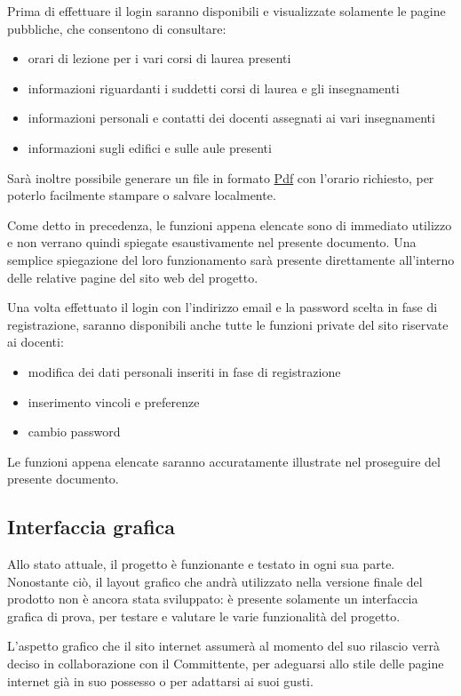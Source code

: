 \documentclass[11pt,a4paper]{article}
\begin{document}
Prima di effettuare il login saranno disponibili e visualizzate solamente le pagine pubbliche, che consentono di consultare:
\begin{itemize}
 \item orari di lezione per i vari corsi di laurea presenti
 \item informazioni riguardanti i suddetti corsi di laurea e gli insegnamenti
 \item informazioni personali e contatti dei docenti assegnati ai vari insegnamenti
 \item informazioni sugli edifici e sulle aule presenti
\end{itemize}
Sarà inoltre possibile generare un file in formato \underline{Pdf} con l'orario richiesto, per poterlo facilmente stampare o salvare localmente.

Come detto in precedenza, le funzioni appena elencate sono di immediato utilizzo e non verrano quindi spiegate esaustivamente nel presente documento.
Una semplice spiegazione del loro funzionamento sarà presente direttamente all'interno delle relative pagine del sito web del progetto.

\bigskip
Una volta effettuato il login con l'indirizzo email e la password scelta in fase di registrazione, saranno disponibili anche tutte le funzioni private del sito riservate ai docenti:
\begin{itemize}
 \item modifica dei dati personali inseriti in fase di registrazione
 \item inserimento vincoli e preferenze
 \item cambio password
\end{itemize}
Le funzioni appena elencate saranno accuratamente illustrate nel proseguire del presente documento.
\subsection{Interfaccia grafica}
Allo stato attuale, il progetto è funzionante e testato in ogni sua parte.
Nonostante ciò, il layout grafico che andrà utilizzato nella versione finale del prodotto non è ancora stata sviluppato: è presente solamente un interfaccia grafica di prova, per testare e valutare le varie funzionalità del progetto.

L'aspetto grafico che il sito internet assumerà al momento del suo rilascio verrà deciso in collaborazione con il Committente, per adeguarsi allo stile delle pagine internet già in suo possesso o per adattarsi ai suoi gusti.
\end{document}
